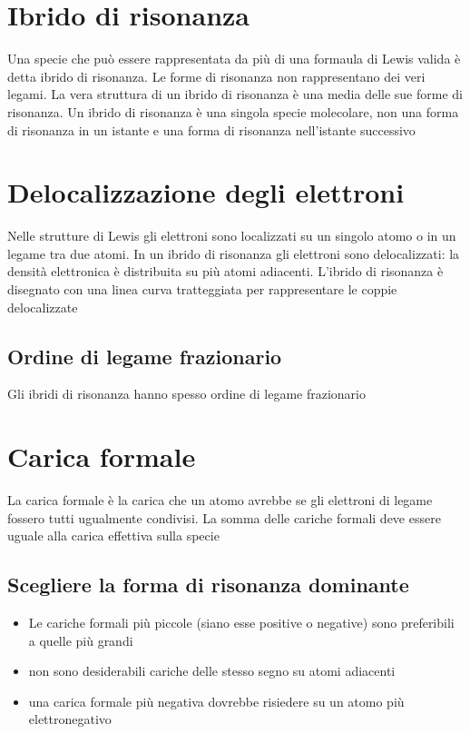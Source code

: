 \documentclass[a4paper,11pt]{report}
\begin{document}
\section{Ibrido di risonanza}

Una specie che può essere rappresentata da più di una formaula di Lewis valida è detta ibrido di risonanza. Le forme di risonanza non rappresentano dei veri legami. La vera struttura di un ibrido di risonanza è una media delle sue forme di risonanza. Un ibrido di risonanza è una singola specie molecolare, non una forma di risonanza in un istante e una forma di risonanza nell'istante successivo

\section{Delocalizzazione degli elettroni}

Nelle strutture di Lewis gli elettroni sono localizzati su un singolo atomo o in un legame tra due atomi. In un ibrido di risonanza gli elettroni sono delocalizzati: la densità elettronica è distribuita su più atomi adiacenti. L'ibrido di risonanza è disegnato con una linea curva tratteggiata per rappresentare le coppie delocalizzate

\subsection*{Ordine di legame frazionario}

Gli ibridi di risonanza hanno spesso ordine di legame frazionario

\section{Carica formale}

La carica formale è la carica che un atomo avrebbe se gli elettroni di legame fossero tutti ugualmente condivisi. La somma delle cariche formali deve essere uguale alla carica effettiva sulla specie

\subsection*{Scegliere la forma di risonanza dominante}

\begin{itemize}
	\item Le cariche formali più piccole (siano esse positive o negative) sono preferibili a quelle più grandi
	\item non sono desiderabili cariche delle stesso segno su atomi adiacenti
	\item una carica formale più negativa dovrebbe risiedere su un atomo più elettronegativo
\end{itemize}
\end{document}
